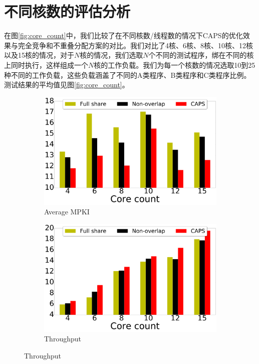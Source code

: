 \section{不同核数的评估分析}

在图\ref{fig:core_count}中，我们比较了在不同核数/线程数的情况下CAPS的优化效果与完全竞争和不重叠分配方案的对比。我们对比了4核、6核、8核、10核、12核以及15核的情况，对于$N$核的情况，我们选取$N$个不同的测试程序，绑在不同的核上同时执行，这样组成一个$N$核的工作负载。我们为每一个核数的情况选取10到25种不同的工作负载，这些负载涵盖了不同的A类程序、B类程序和C类程序比例。测试结果的平均值见图\ref{fig:core_count}。

\begin{figure}[htbp] 
    \centering
    \begin{subfigure}[b]{0.5\linewidth}
        \centering\includegraphics[width=0.9\linewidth]{figures/mpki.pdf}
        \caption{Average MPKI}
    \end{subfigure}%
    \begin{subfigure}[b]{0.5\linewidth}
        \centering\includegraphics[width=0.9\linewidth]{figures/ipc.pdf}
        \caption{Throughput}

\end{subfigure}
\end{figure}

